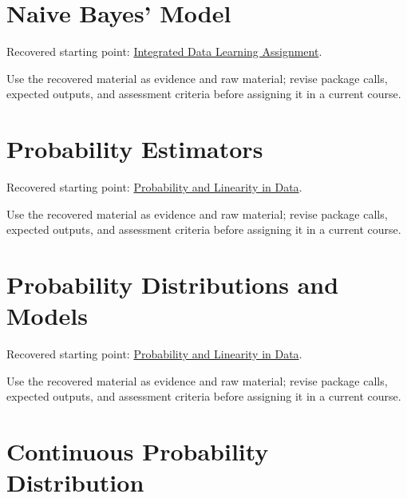 \documentclass[
  letterpaper,
]{scrbook}
\begin{document}
\section*{Naive Bayes' Model}\label{sec-pr-04-naive-bayes-model}


Recovered starting point:
\hyperref[sec-lab-integrated-learning-assignment]{Integrated Data
Learning Assignment}.

Use the recovered material as evidence and raw material; revise package
calls, expected outputs, and assessment criteria before assigning it in
a current course.

\section*{Probability
Estimators}\label{sec-pr-04-probability-estimators}


Recovered starting point:
\hyperref[sec-lab-probability-linearity]{Probability and Linearity in
Data}.

Use the recovered material as evidence and raw material; revise package
calls, expected outputs, and assessment criteria before assigning it in
a current course.

\section*{Probability Distributions and
Models}\label{sec-pr-04-probability-distributions-and-models}


Recovered starting point:
\hyperref[sec-lab-probability-linearity]{Probability and Linearity in
Data}.

Use the recovered material as evidence and raw material; revise package
calls, expected outputs, and assessment criteria before assigning it in
a current course.

\section*{Continuous Probability
Distribution}\label{sec-pr-04-continuous-probability-distribution}
\end{document}
